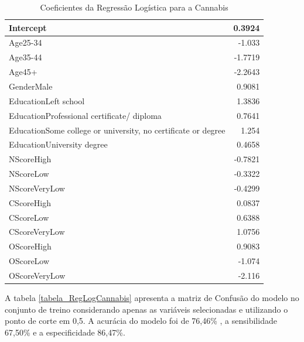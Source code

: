 \documentclass[
	article,			%
	11pt,				%
	oneside,			%
	a4paper,			%
	english,			%
	brazil,				%
	sumario=tradicional
	]{abntex2}
\begin{document}
\begin{table}[H]
\centering
\begin{tabular}{|l|r|}
\hline
Intercept                                                     & 0.3924 \\ \hline
Age25-34                                                      & -1.033 \\ \hline
Age35-44                                                      & -1.7719 \\ \hline
Age45+                                                        & -2.2643 \\ \hline
GenderMale                                                    & 0.9081  \\ \hline
EducationLeft school                                          & 1.3836  \\ \hline
EducationProfessional certificate/ diploma                    & 0.7641  \\ \hline
EducationSome college or university, no certificate or degree & 1.254  \\ \hline
EducationUniversity degree                                    & 0.4658 \\ \hline
NScoreHigh                                                    & -0.7821 \\ \hline
NScoreLow                                                     & -0.3322 \\ \hline
NScoreVeryLow                                                 & -0.4299 \\ \hline
CScoreHigh                                                    & 0.0837 \\ \hline
CScoreLow                                                     & 0.6388  \\ \hline
CScoreVeryLow                                                 & 1.0756  \\ \hline
OScoreHigh                                                    & 0.9083  \\ \hline
OScoreLow                                                     & -1.074 \\ \hline
OScoreVeryLow                                                 & -2.116 \\ \hline
\end{tabular}
\caption{Coeficientes da Regressão Logística para a Cannabis}
\label{coef_reglog_cannabis}
\end{table}


A tabela \ref{tabela_RegLogCannabis} apresenta a matriz de Confusão do modelo no conjunto de treino considerando apenas as variáveis selecionadas e utilizando o ponto de corte em 0,5. A acurácia do modelo foi de 76,46\% , a sensibilidade 67,50\% e a especificidade 86,47\%.
\end{document}

